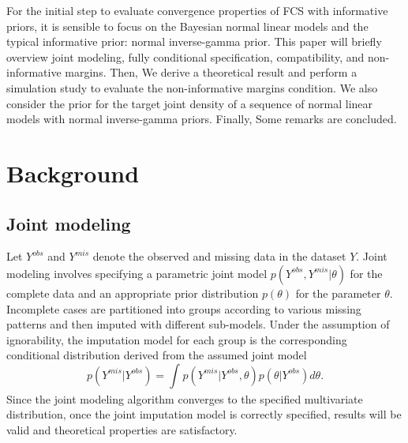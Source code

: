 	For the initial step to evaluate convergence properties of FCS with informative priors, it is sensible to focus on the Bayesian normal linear models and the typical informative prior: normal inverse-gamma prior. This paper will briefly overview joint modeling, fully conditional specification, compatibility, and non-informative margins. Then, We derive a theoretical result and perform a simulation study to evaluate the non-informative margins condition. We also consider the prior for the target joint density of a sequence of normal linear models with normal inverse-gamma priors. Finally, Some remarks are concluded.
	
	\section{Background}
	\subsection{Joint modeling}
	Let $Y^{obs}$ and $Y^{mis}$ denote the observed and missing data in the dataset $Y$. Joint modeling involves specifying a parametric joint model $p(Y^{obs}, Y^{mis}|\theta)$ for the complete data and an appropriate prior distribution $p(\theta)$ for the parameter $\theta$. Incomplete cases are partitioned into groups according to various missing patterns and then imputed with different sub-models. Under the assumption of ignorability, the imputation model for each group is the corresponding conditional distribution derived from the assumed joint model 
	\begin{equation*}
		p(Y^{mis}|Y^{obs}) = \int_{}p(Y^{mis}| Y^{obs}, \theta)p(\theta|Y^{obs})d\theta.
	\end{equation*}
	Since the joint modeling algorithm converges to the specified multivariate distribution, once the joint imputation model is correctly specified, results will be valid and theoretical properties are satisfactory. 
	
